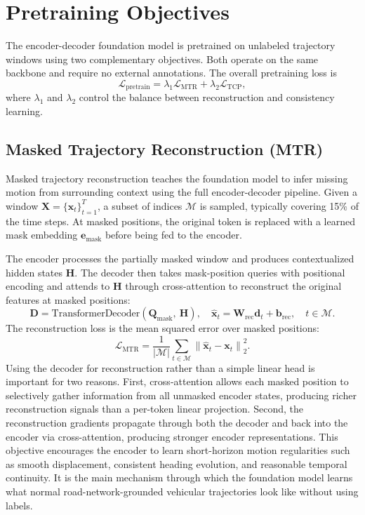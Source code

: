\documentclass[12pt]{article}
\begin{document}
\section{Pretraining Objectives}\label{sec:objectives}

The encoder-decoder foundation model is pretrained on unlabeled trajectory windows using two complementary objectives. Both operate on the same backbone and require no external annotations. The overall pretraining loss is
\begin{equation}
\mathcal{L}_{\text{pretrain}} = \lambda_1 \mathcal{L}_{\text{MTR}} + \lambda_2 \mathcal{L}_{\text{TCP}},
\end{equation}
where $\lambda_1$ and $\lambda_2$ control the balance between reconstruction and consistency learning.

\subsection{Masked Trajectory Reconstruction (MTR)}

Masked trajectory reconstruction teaches the foundation model to infer missing motion from surrounding context using the full encoder-decoder pipeline. Given a window $\mathbf{X} = \{\mathbf{x}_t\}_{t=1}^{T}$, a subset of indices $\mathcal{M}$ is sampled, typically covering 15\% of the time steps. At masked positions, the original token is replaced with a learned mask embedding $\mathbf{e}_{\text{mask}}$ before being fed to the encoder.

The encoder processes the partially masked window and produces contextualized hidden states $\mathbf{H}$. The decoder then takes mask-position queries with positional encoding and attends to $\mathbf{H}$ through cross-attention to reconstruct the original features at masked positions:
\begin{equation}
\mathbf{D} = \text{TransformerDecoder}(\mathbf{Q}_{\text{mask}},\ \mathbf{H}), \quad \hat{\mathbf{x}}_t = \mathbf{W}_{\text{rec}} \mathbf{d}_t + \mathbf{b}_{\text{rec}}, \quad t \in \mathcal{M}.
\end{equation}
The reconstruction loss is the mean squared error over masked positions:
\begin{equation}
\mathcal{L}_{\text{MTR}} = \frac{1}{|\mathcal{M}|} \sum_{t \in \mathcal{M}} \left\|\hat{\mathbf{x}}_t - \mathbf{x}_t\right\|_2^2.
\end{equation}
Using the decoder for reconstruction rather than a simple linear head is important for two reasons. First, cross-attention allows each masked position to selectively gather information from all unmasked encoder states, producing richer reconstruction signals than a per-token linear projection. Second, the reconstruction gradients propagate through both the decoder and back into the encoder via cross-attention, producing stronger encoder representations. This objective encourages the encoder to learn short-horizon motion regularities such as smooth displacement, consistent heading evolution, and reasonable temporal continuity. It is the main mechanism through which the foundation model learns what normal road-network-grounded vehicular trajectories look like without using labels.
\end{document}
